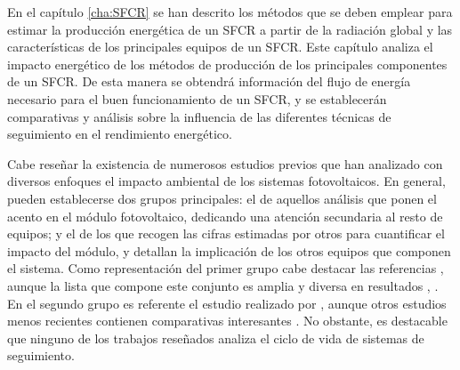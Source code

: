 En el capítulo \ref{cha:SFCR} se han descrito los métodos que se deben
emplear para estimar la producción energética de un SFCR a partir de
la radiación global y las características de los principales equipos
de un SFCR. Este capítulo analiza el impacto energético de los métodos
de producción de los principales componentes de un SFCR.  De esta
manera se obtendrá información del flujo de energía necesario para el
buen funcionamiento de un SFCR, y se establecerán comparativas y
análisis sobre la influencia de las diferentes técnicas de seguimiento
en el rendimiento energético.

Cabe reseñar la existencia de numerosos estudios previos que han
analizado con diversos enfoques el impacto ambiental de los sistemas
fotovoltaicos.  En general, pueden establecerse dos grupos
principales: el de aquellos análisis que ponen el acento en el módulo
fotovoltaico, dedicando una atención secundaria al resto de equipos; y
el de los que recogen las cifras estimadas por otros para cuantificar
el impacto del módulo, y detallan la implicación de los otros equipos
que componen el sistema.  Como representación del primer grupo cabe
destacar las referencias \cite{Alsema2000, Alsema.Wild-Scholten2006,
  Wild-Scholten2013}, aunque la lista que compone este conjunto es
amplia y diversa en resultados \cite{Keoleian.Lewis1997},
\cite{Knapp.Jesterm2001, Jungbluth2005, Dones.Frischkenecht1998}. En
el segundo grupo es referente el estudio realizado por
\cite{Mason.Ftherakis.ea2006}, aunque otros estudios menos recientes
contienen comparativas interesantes \cite{Meier2002,
  Krauter.Ruether2004,Frankl.Masini.ea1998}. No obstante, es
destacable que ninguno de los trabajos reseñados analiza el ciclo de
vida de sistemas de seguimiento.


